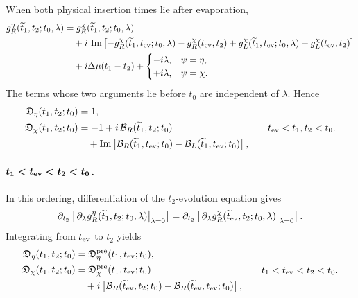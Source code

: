 \documentclass[11pt,a4paper]{article}
\begin{document}
When both physical insertion times lie after evaporation,
\begin{equation}
\begin{aligned}
  g_R^\eta(\widetilde t_1,t_2;t_0,\lambda)
  &=
  g_R^\chi(\widetilde t_1,t_2;t_0,\lambda)
  \\
  &\quad
  +
  i\,\operatorname{Im}
  \left[
  -g_R^\chi(\widetilde t_1,t_{\rm ev};t_0,\lambda)
  -g_R^\chi(t_{\rm ev},t_2)
+g_L^\chi(\widetilde t_1,t_{\rm ev};t_0,\lambda)
  +g_L^\chi(t_{\rm ev},t_2)
  \right]
  \\
  &\quad
  +
  i\Delta\mu(t_1-t_2)
  +
  \begin{cases}
  -i\lambda,
  &
  \psi=\eta,
  \\
  +i\lambda,
  &
  \psi=\chi .
  \end{cases}
\end{aligned}
\label{eq:S4-bilocal-region-III-integrated}
\end{equation}
The terms whose two arguments lie before \(t_0\) are independent of
\(\lambda\). Hence
\begin{equation}
\begin{aligned}
  \mathfrak D_\eta(t_1,t_2;t_0)
  &=
  1,
  \\
  \mathfrak D_\chi(t_1,t_2;t_0)
  &=
  -1
  +
  i\,\mathcal B_R(\widetilde t_1,t_2;t_0)
  \\
  &\quad
  +
  \operatorname{Im}
  \left[
  \mathcal B_R(\widetilde t_1,t_{\rm ev};t_0)
  -
  \mathcal B_L(\widetilde t_1,t_{\rm ev};t_0)
  \right],
\end{aligned}
\qquad
t_{\rm ev}<t_1,t_2<t_0 .
\label{eq:S4-bilocal-region-III-result}
\end{equation}

\paragraph*{\(\boldsymbol{t_1<t_{\rm ev}<t_2<t_0}\).}

In this ordering, differentiation of the \(t_2\)-evolution equation gives
\begin{equation}
  \partial_{t_2}
  \left[
  \left.
  \partial_\lambda
  g_R^\eta(\widetilde t_1,t_2;t_0,\lambda)
  \right|_{\lambda=0}
  \right]
  =
  \partial_{t_2}
  \left[
  \left.
  \partial_\lambda
  g_R^\chi(\widetilde t_{\rm ev},t_2;t_0,\lambda)
  \right|_{\lambda=0}
  \right].
\label{eq:S4-bilocal-region-IV-equation}
\end{equation}
Integrating from \(t_{\rm ev}\) to \(t_2\) yields
\begin{equation}
\begin{aligned}
  \mathfrak D_\eta(t_1,t_2;t_0)
  &=
  \mathfrak D^{\rm pre}_\eta(t_1,t_{\rm ev};t_0),
  \\
  \mathfrak D_\chi(t_1,t_2;t_0)
  &=
  \mathfrak D^{\rm pre}_\chi(t_1,t_{\rm ev};t_0)
  \\
  &\quad
  +
  i
  \left[
  \mathcal B_R(\widetilde t_{\rm ev},t_2;t_0)
  -
  \mathcal B_R(\widetilde t_{\rm ev},t_{\rm ev};t_0)
  \right],
\end{aligned}
\qquad
t_1<t_{\rm ev}<t_2<t_0 .
\label{eq:S4-bilocal-region-IV-result}
\end{equation}
\end{document}

